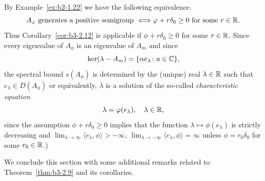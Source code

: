 \begin{example}
\begin{enumerate}[\upshape (i), wide, labelindent=.25em]
By Example~\ref{ex:b2-1.22} we have the following equivalence.
\begin{equation}\label{eq:b3-2.29}
	A_{\phi} \text{ generates a positive semigroup } \Longleftrightarrow \phi + r\delta_{0} \geq 0 \text{ for some } r \in \R.
\end{equation}
Thus Corollary~\ref{cor:b3-2.12} is applicable if\/ $\phi + r\delta_{0} \geq 0$ for some $r \in \mathbb{R}$.
Since every eigenvalue of\/ $A_{\phi}$ is an eigenvalue of\/ $A_{m}$ and since 
\[
\mathop{}\mathrm{ker}(\lambda-A_{m}) = \{\alpha e_{\lambda} \colon a \in \mathbb{C}\} , 
\]
the spectral bound $s(A_{\phi})$ is determined by the (unique) real $\lambda \in \mathbb{R}$ such that $e_{\lambda} \in D(A_{\phi})$ or equivalently, $\lambda$ is a solution of the so-called \emph{characteristic equation}
\begin{equation}\label{eq:b3-2.30}
	\lambda = \phi(e_{\lambda}), \quad \lambda \in \R , 
\end{equation}
since the assumption $\phi + r\delta_{0} \geq 0$ implies that the function $\lambda \mapsto \phi(e_{\lambda})$ is strictly decreasing and $\lim_{\lambda \to \infty}\langle e_{\lambda},\phi \rangle > -\infty$, $\lim_{\lambda \to -\infty}\langle e_{\lambda},\phi \rangle = \infty$ unless $\phi = r_{0}\delta_{0}$ for some $r_{0} \in \mathbb{R}$.)
\end{enumerate}
\end{example}
We conclude this section with some additional remarks related to Theorem~\ref{thm:b3-2.9} and its corollaries.
